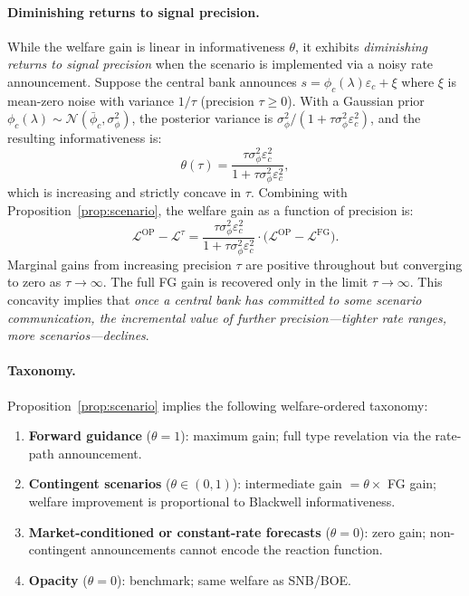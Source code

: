 \paragraph{Diminishing returns to signal precision.}
While the welfare gain is linear in informativeness $\theta$, it exhibits
\emph{diminishing returns to signal precision} when the scenario is implemented via
a noisy rate announcement. Suppose the central bank announces
$s = \phi_c(\lambda)\varepsilon_c + \xi$ where $\xi$ is mean-zero noise with
variance $1/\tau$ (precision $\tau \geq 0$). With a Gaussian prior
$\phi_c(\lambda) \sim \mathcal{N}(\bar{\phi}_c, \sigma_\phi^2)$, the posterior
variance is $\sigma_\phi^2/(1 + \tau\sigma_\phi^2\varepsilon_c^2)$, and the
resulting informativeness is:
\begin{equation}
  \theta(\tau) = \frac{\tau\sigma_\phi^2\varepsilon_c^2}{1 + \tau\sigma_\phi^2\varepsilon_c^2},
  \label{eq:theta_tau}
\end{equation}
which is increasing and strictly concave in $\tau$. Combining with
Proposition~\ref{prop:scenario}, the welfare gain as a function of precision is:
\begin{equation}
  \mathcal{L}^{\mathrm{OP}} - \mathcal{L}^\tau
  = \frac{\tau\sigma_\phi^2\varepsilon_c^2}{1 + \tau\sigma_\phi^2\varepsilon_c^2}
    \cdot \bigl(\mathcal{L}^{\mathrm{OP}} - \mathcal{L}^{\mathrm{FG}}\bigr).
  \label{eq:welfare_tau}
\end{equation}
Marginal gains from increasing precision $\tau$ are positive throughout but
converging to zero as $\tau \to \infty$. The full FG gain is recovered only in the
limit $\tau \to \infty$. This concavity implies that \emph{once a central bank has
committed to some scenario communication, the incremental value of further
precision---tighter rate ranges, more scenarios---declines}.

\paragraph{Taxonomy.}
Proposition~\ref{prop:scenario} implies the following welfare-ordered taxonomy:

\begin{enumerate}[label=\arabic*.]
  \item \textbf{Forward guidance} ($\theta = 1$): maximum gain; full type
        revelation via the rate-path announcement.
  \item \textbf{Contingent scenarios} ($\theta \in (0,1)$): intermediate gain
        $= \theta \times$ FG gain; welfare improvement is proportional to
        Blackwell informativeness.
  \item \textbf{Market-conditioned or constant-rate forecasts} ($\theta = 0$):
        zero gain; non-contingent announcements cannot encode the reaction function.
  \item \textbf{Opacity} ($\theta = 0$): benchmark; same welfare as SNB/BOE.
\end{enumerate}

